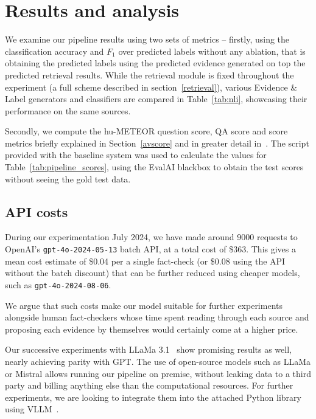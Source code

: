 
\section{Results and analysis}
\label{sec:results}

We examine our pipeline results using two sets of metrics -- firstly, using the classification accuracy and $F_1$ over predicted labels without any ablation, that is obtaining the predicted labels using the predicted evidence generated on top the predicted retrieval results. While the retrieval module is fixed throughout the experiment (a full scheme described in section~\ref{retrieval}), various Evidence \& Label generators and classifiers are compared in Table~\ref{tab:nli}, showcasing their performance on the same sources.
\begin{table}[H]
    
\end{table}

\begin{table*}[h]
    
\end{table*}
Secondly, we compute the hu-METEOR question score, QA score and \averitec{} score metrics briefly explained in Section~\ref{avscore} and in greater detail in~\cite{averitec2024}.
The script provided with the baseline system was used to calculate the values for Table~\ref{tab:pipeline_scores}, using the EvalAI blackbox to obtain the test scores without seeing the gold test data.

\subsection{API costs}
During our experimentation July 2024, we have made around 9000 requests to OpenAI's \texttt{gpt-4o-2024-05-13} batch API, at a total cost of \$363.
This gives a mean cost estimate of \$0.04 per a single fact-check (or \$0.08 using the API without the batch discount) that can be further reduced using cheaper models, such as \texttt{gpt-4o-2024-08-06}.

We argue that such costs make our model suitable for further experiments alongside human fact-checkers whose time spent reading through each source and proposing each evidence by themselves would certainly come at a higher price.

Our successive experiments with LLaMa 3.1~\cite{meta2024llama31} show promising results as well, nearly achieving parity with GPT.
The use of open-source models such as LLaMa or Mistral allows running our pipeline on premise, without leaking data to a third party and billing anything else than the computational resources.
For further experiments, we are looking to integrate them into the attached Python library using VLLM~\cite{vllm}.


